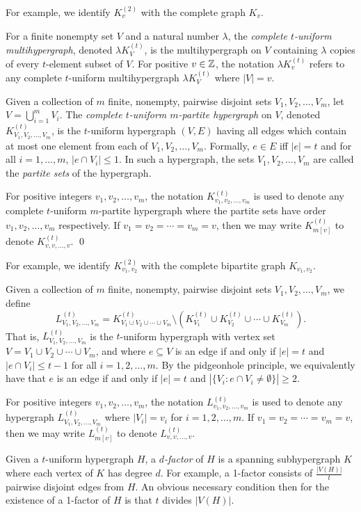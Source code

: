 For example, we identify $K_v^{(2)}$ with the complete graph $K_v$.

For a finite nonempty set $V$ and a natural number $\lambda$, the {\em complete
$t$-uniform multihypergraph}, denoted $\lambda K_{V}^{(t)}$, is the
multihypergraph on $V$ containing $\lambda$ copies of every $t$-element subset
of $V$. For positive $v \in \mathbb{Z}$, the notation $\lambda K_{v}^{(t)}$ refers to
any complete $t$-uniform multihypergraph $\lambda K_{V}^{(t)}$ where $|V| = v$.

\begin{definition}
Given a collection of $m$ finite, nonempty, pairwise disjoint sets
$V_1, V_2 ,\ldots, V_m$, let $V = \bigcup_{i=1}^{m} V_i$.
The {\em complete $t$-uniform $m$-partite hypergraph} on $V$, denoted
$K_{V_1, V_2, \ldots, V_m}^{(t)}$, is the $t$-uniform hypergraph $(V, E)$ having
all edges which contain at most one element from each of $V_1, V_2, \ldots, V_m$.
Formally, $e \in E$ iff $|e| = t$ and for all $i=1,\ldots,m$, $|e \cap V_i| \leq 1$.
In such a hypergraph, the sets $V_1, V_2, \ldots, V_m$ are called the
{\em partite sets} of the hypergraph.

For positive integers $v_1, v_2, \ldots, v_m$, the notation $K_{v_1, v_2,
\ldots, v_m}^{(t)}$ is used to denote any complete $t$-uniform $m$-partite
hypergraph where the partite sets have order $v_1, v_2, \ldots, v_m$
respectively.
If $v_1 = v_2 = \cdots = v_m = v$, then we may write $K_{m[v]}^{(t)}$ to denote
$K_{v, v, \ldots, v}^{(t)}$.
\qed
\end{definition}

For example, we identify $K_{v_1, v_2}^{(2)}$ with the complete bipartite graph
$K_{v_1,v_2}$.


Given a collection of $m$ finite, nonempty, pairwise disjoint sets
$V_1, V_2, \ldots, V_m$, we define
\[
    L_{V_1, V_2, \ldots, V_m}^{(t)} = K_{V_1 \cup V_2 \cup \cdots \cup V_m}^{(t)} \setminus
    (K_{V_1}^{(t)} \cup K_{V_2}^{(t)} \cup \cdots \cup K_{V_m}^{(t)}).
\]
That is, $L_{V_1, V_2, \ldots, V_m}^{(t)}$ is the $t$-uniform hypergraph with
vertex set $V = V_1 \cup V_2 \cup \cdots \cup V_m$, and where
$e \subseteq V$ is an edge if and only if $|e| = t$ and $|e \cap V_i| \leq t-1$
for all $i = 1,2,\ldots,m$. By the pidgeonhole principle, we equivalently have
that $e$ is an edge if and only if
$|e| = t$ and $|\{ V_i : e \cap V_i \neq \emptyset \}| \geq 2$.

For positive integers $v_1, v_2, \ldots, v_m$, the notation $L_{v_1, v_2,
\ldots, v_m}^{(t)}$ is used to denote any hypergraph
$L_{V_1, V_2, \ldots, V_m}^{(t)}$ where $|V_i| = v_i$ for $i = 1,2,\ldots,m$.
If $v_1 = v_2 = \cdots = v_m = v$, then we may write $L_{m[v]}^{(t)}$ to denote
$L_{v, v, \ldots, v}^{(t)}$.

Given a $t$-uniform hypergraph $H$, a {\em $d$-factor} of $H$ is a spanning
subhypergraph $K$ where each vertex of $K$ has degree $d$. For example, a
1-factor consists of $\frac{|V(H)|}{t}$ pairwise disjoint edges from $H$. An
obvious necessary condition then for the existence of a 1-factor of $H$ is that
$t$ divides $|V(H)|$.

